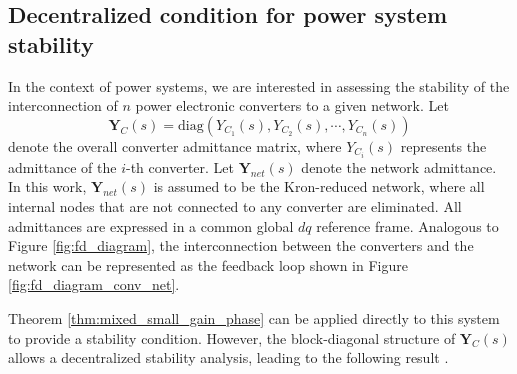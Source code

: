 \subsection{Decentralized condition for power system stability}
In the context of power systems, we are interested in assessing the stability of the interconnection of $n$ power electronic converters to a given network. 
Let 
\begin{equation}
    \mathbf{Y}_C(s)=\text{diag}(Y_{C_1}(s),Y_{C_2}(s),\cdots,Y_{C_n}(s))
    \label{eq:block_diagonal}
\end{equation}
denote the overall converter admittance matrix, where $Y_{C_i}(s)$ represents the admittance of the $i$-th converter. Let $\mathbf{Y}_{net}(s)$ denote the network admittance. In this work, $\mathbf{Y}_{net}(s)$ is assumed to be the Kron-reduced network, where all internal nodes that are not connected to any converter are eliminated. All admittances are expressed in a common global $dq$ reference frame. Analogous to Figure \ref{fig:fd_diagram},  the interconnection between the converters and the network can be represented as the feedback loop shown in Figure \ref{fig:fd_diagram_conv_net}.

Theorem \ref{thm:mixed_small_gain_phase} can be applied directly to this system to provide a stability condition. However, the block-diagonal structure of $\mathbf{Y}_C(s)$ allows a decentralized stability analysis, leading to the following result \cite{huangGainPhaseDecentralized2024}.

